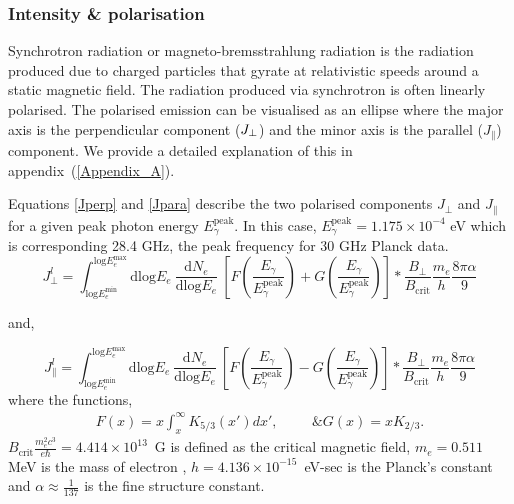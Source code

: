 \documentclass[12pt, a4 paper]{article}
\begin{document}
\subsubsection{Intensity \& polarisation}
Synchrotron radiation or magneto-bremsstrahlung radiation is the radiation produced due to charged particles that gyrate at relativistic speeds around a static magnetic field. The radiation produced via synchrotron is often linearly polarised.
The polarised emission can be visualised as an ellipse where the major axis is the perpendicular component ($J_{\rm \perp}$) and the minor axis is the parallel ($J_{\parallel}$) component. We provide a detailed explanation of this in appendix~(\ref{Appendix_A}). 

Equations \ref{Jperp} and \ref{Jpara} describe the two polarised components $J_{\perp}$ and $J_{\parallel}$ for a  given peak photon energy $E_{\gamma}^{\mathrm{peak}}$. In this case, $E_{\gamma}^{\mathrm{peak}} = 1.175 \times 10^{-4}$ eV which is corresponding 28.4 GHz, the peak frequency for 30 GHz Planck data.
\begin{equation}\label{Jperp}
 {J_{\perp}^l} =   \int_{\mathrm{log}E_e^{\mathrm{min}}}^{\mathrm{log}E_e^{\mathrm{max}}}\mathrm{dlog}E_{e} \  \frac{\mathrm{d}N_e}{\mathrm{dlog}E_{e}} \  \left[F\left(\frac{E_{\gamma}}{E_{\gamma}^{\mathrm{peak}}}\right) + G\left(\frac{E_{\gamma}}{E_{\gamma}^{\mathrm{peak}}}\right)\right] * \frac{B_{\perp}}{B_{\mathrm{crit}}}\frac{m_{e}}{h} \frac{8\pi \alpha}{9} 
\end{equation}

and,

\begin{equation}\label{Jpara}
{J_{\parallel}^l} = \int_{\mathrm{log}E_e^{\mathrm{min}}}^{\mathrm{log}E_e^{\mathrm{max}}}\mathrm{dlog}E_{e} \ \frac{\mathrm{d}N_e}{\mathrm{dlog}E_{e}} \  \left[F\left(\frac{E_{\gamma}}{E_{\gamma}^{\mathrm{peak}}}\right) - G\left(\frac{E_{\gamma}}{E_{\gamma}^{\mathrm{peak}}}\right)\right] * \frac{B_{\perp}}{B_{\mathrm{crit}}}\frac{m_{e}}{h} \frac{8\pi \alpha}{9}
\end{equation}
where the functions,
\begin{align}
F(x) = x \int_x^\infty K_{5/3}(x') dx',  \hspace{1cm}  \&   G(x) = x K_{2/3}.
\end{align}
$B_{\mathrm{crit}} \frac{m_e^2c^3}{e\hbar} = 4.414 \times 10^{13}$~G is defined as the critical magnetic field, $m_e = 0.511$ MeV is the mass of electron , $h = 4.136 \times 10^{-15}$~eV-sec is the Planck's constant and $\alpha \approx \frac{1}{137}$ is the fine structure constant.
\end{document}
